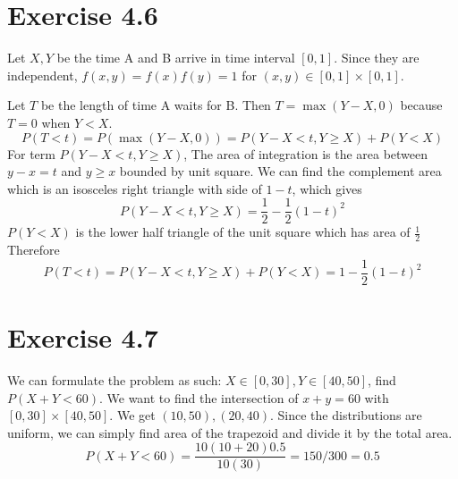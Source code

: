 \documentclass[12pt]{article}
\begin{document}
\section*{Exercise 4.6}
Let $X, Y$ be the time A and B arrive in time interval $[0,1]$. Since they are independent, $f(x,y) = f(x) f(y) = 1$ for $(x,y) \in [0,1]\times [0,1]$.

Let $T$ be the length of time A waits for B. Then $T = \max (Y - X, 0)$ because $T=0$ when $Y < X$. 
$$ P(T < t) = P(\max (Y - X, 0)) = P(Y - X < t, Y \geq X) + P(Y < X)$$ 
For term $P(Y - X < t, Y \geq X)$, The area of integration is the area between $y - x = t$ and $ y \geq x$ bounded by unit square. We can find the complement area which is an isosceles right triangle with side of $1-t$, which gives
$$ P(Y - X < t, Y \geq X) =   \frac{1}{2} - \frac{1}{2} (1-t)^2$$
$P(Y<X)$ is the lower half triangle of the unit square which has area of $\frac{1}{2}$
Therefore 
$$P(T < t) = P(Y - X < t, Y \geq X) + P(Y < X) = 1 - \frac{1}{2} (1-t)^2$$


\section*{Exercise 4.7}
We can formulate the problem as such: $X \in [0,30], Y \in [40,50]$, find $P(X+Y < 60)$. We want to find the intersection of $x+y=60$ with $[0,30] \times [40, 50]$. We get $(10,50), (20,40)$. Since the distributions are uniform, we can simply find area of the trapezoid and divide it by the total area. 
$$P(X+Y < 60) = \frac{10(10 + 20)0.5}{10(30)} = 150/300 = 0.5$$
\end{document}
